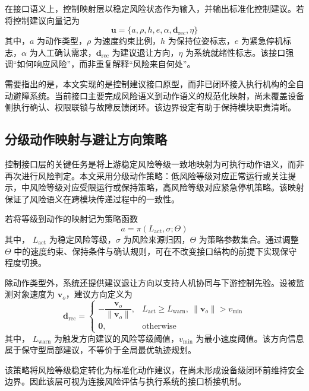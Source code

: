在接口语义上，控制映射层以稳定风险状态作为输入，并输出标准化控制建议。若将控制建议向量记为
\begin{equation}
\mathbf{u}=\{a,\rho,h,e,\alpha,\mathbf{d}_{\mathrm{rec}},\eta\}
\end{equation}
其中，$a$ 为动作类型，$\rho$ 为速度约束比例，$h$ 为保持位姿标志，$e$ 为紧急停机标志，$\alpha$ 为人工确认需求，$\mathbf{d}_{\mathrm{rec}}$ 为建议退让方向，$\eta$ 为系统就绪性标志。该接口强调“如何响应风险”，而非重复解释“风险来自何处”。

需要指出的是，本文实现的是控制建议接口原型，而非已闭环接入执行机构的全自动避障系统。当前接口主要完成风险语义到动作语义的规范化映射，尚未覆盖设备侧执行确认、权限联锁与故障反馈闭环。该边界设定有助于保持模块职责清晰。

\subsection{分级动作映射与避让方向策略}\label{subsec_ch5_control_strategy}

控制接口层的关键任务是将上游稳定风险等级一致地映射为可执行动作语义，而非再次进行风险判定。本文采用分级动作策略：低风险等级对应正常运行或关注提示，中风险等级对应受限运行或保持策略，高风险等级对应紧急停机策略。该映射保证了风险语义在跨模块传递过程中的一致性。

若将等级到动作的映射记为策略函数
\begin{equation}
a=\pi(L_{\mathrm{act}},\sigma;\Theta)
\end{equation}
其中， $L_{\mathrm{act}}$ 为稳定风险等级，$\sigma$ 为风险来源归因，$\Theta$ 为策略参数集合。通过调整 $\Theta$ 中的速度约束、保持条件与确认规则，可在不改变接口结构的前提下实现保守程度切换。

除动作类型外，系统还提供建议退让方向以支持人机协同与下游控制先验。设被监测对象速度为 $\mathbf{v}_o$，建议方向定义为
\begin{equation}
\mathbf{d}_{\mathrm{rec}}=
\begin{cases}
-\dfrac{\mathbf{v}_o}{\|\mathbf{v}_o\|}, & L_{\mathrm{act}}\geq L_{\mathrm{warn}},\ \|\mathbf{v}_o\|>v_{\min}\\
\mathbf{0}, & \text{otherwise}
\end{cases}
\end{equation}
其中， $L_{\mathrm{warn}}$ 为触发方向建议的风险等级阈值，$v_{\min}$ 为最小速度阈值。该方向信息属于保守型局部建议，不等价于全局最优轨迹规划。

该策略将风险等级稳定转化为标准化动作建议，在尚未形成设备级闭环前维持安全边界。因此该层可视为连接风险评估与执行系统的接口桥接机制。

